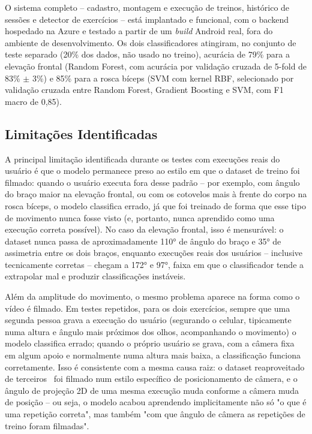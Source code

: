 \documentclass[12pt]{article}
\begin{document}
O sistema completo -- cadastro, montagem e execução de treinos, histórico
de sessões e detector de exercícios -- está implantado e funcional, com o
backend hospedado na Azure e testado a partir de um \textit{build} Android
real, fora do ambiente de desenvolvimento. Os dois classificadores
atingiram, no conjunto de teste separado (20\% dos dados, não usado no
treino), acurácia de 79\% para a elevação frontal (Random Forest, com
acurácia por validação cruzada de 5-fold de 83\% $\pm$ 3\%) e 85\% para a
rosca bíceps (SVM com kernel RBF, selecionado por validação cruzada entre
Random Forest, Gradient Boosting e SVM, com F1 macro de 0,85).

\subsection{Limitações Identificadas}

A principal limitação identificada durante os testes com execuções reais
do usuário é que o modelo permanece preso ao estilo em que o dataset de
treino foi filmado: quando o usuário executa fora desse padrão -- por
exemplo, com ângulo do braço maior na elevação frontal, ou com os
cotovelos mais à frente do corpo na rosca bíceps, o modelo classifica
errado, já que foi treinado de forma que esse tipo de movimento nunca
fosse visto (e, portanto, nunca aprendido como uma execução correta
possível). No caso da elevação frontal, isso é mensurável: o dataset
nunca passa de aproximadamente 110° de ângulo do braço e 35° de
assimetria entre os dois braços, enquanto execuções reais dos usuários --
inclusive tecnicamente corretas -- chegam a 172° e 97°, faixa em que o
classificador tende a extrapolar mal e produzir classificações instáveis.

Além da amplitude do movimento, o mesmo problema aparece na forma como o
vídeo é filmado. Em testes repetidos, para os dois exercícios, sempre que
uma segunda pessoa grava a execução do usuário (segurando o celular,
tipicamente numa altura e ângulo mais próximos dos olhos, acompanhando o
movimento) o modelo classifica errado; quando o próprio usuário se grava,
com a câmera fixa em algum apoio e normalmente numa altura mais baixa, a
classificação funciona corretamente. Isso é consistente com a mesma causa
raiz: o dataset reaproveitado de terceiros~\cite{chen2020posetrainerrepo}
foi filmado num estilo específico de posicionamento de câmera, e o ângulo
de projeção 2D de uma mesma execução muda conforme a câmera muda de
posição -- ou seja, o modelo acabou aprendendo implicitamente não só "o
que é uma repetição correta", mas também "com que ângulo de câmera as
repetições de treino foram filmadas".
\end{document}
